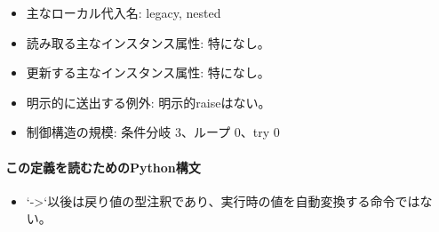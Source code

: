 \documentclass[a4paper,11pt]{article}
\begin{document}
\begin{itemize}[leftmargin=1.6em]
              \item 主なローカル代入名: legacy, nested
              \item 読み取る主なインスタンス属性: 特になし。
              \item 更新する主なインスタンス属性: 特になし。
              \item 明示的に送出する例外: 明示的raiseはない。
              \item 制御構造の規模: 条件分岐 3、ループ 0、try 0
            \end{itemize}
            \paragraph{この定義を読むためのPython構文}
            \begin{itemize}[leftmargin=1.6em]
            \item `->`以後は戻り値の型注釈であり、実行時の値を自動変換する命令ではない。
            \end{itemize}
\end{document}
